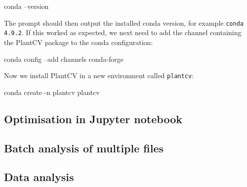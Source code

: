 \documentclass[10pt]{article}
\begin{document}
 \begin{bashcode}
 	conda --version
 \end{bashcode}

The prompt should then output the installed conda version, for example \texttt{conda 4.9.2}. If this worked as expected, we next need to add the channel containing the PlantCV package to the conda configuration:

\begin{bashcode}
	conda config --add channels conda-forge
\end{bashcode}

Now we install PlantCV in a new environment called \texttt{plantcv}:

\begin{bashcode}
	conda create -n plantcv plantcv
\end{bashcode}

\subsection{Optimisation in Jupyter notebook}

\subsection{Batch analysis of multiple files}

\subsection{Data analysis}
\end{document}
